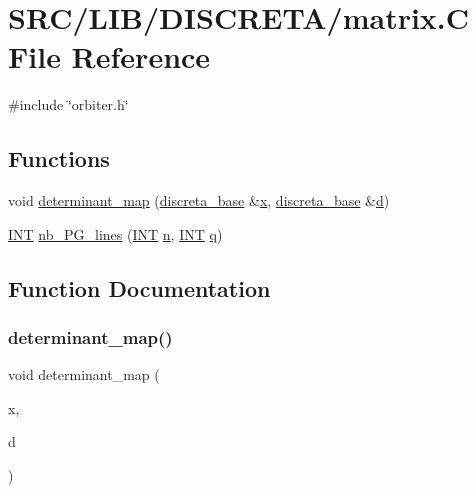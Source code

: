 \hypertarget{matrix_8_c}{}\section{S\+R\+C/\+L\+I\+B/\+D\+I\+S\+C\+R\+E\+T\+A/matrix.C File Reference}
\label{matrix_8_c}
{\ttfamily \#include \char`\"{}orbiter.\+h\char`\"{}}\newline
\subsection*{Functions}
\begin{DoxyCompactItemize}
\item 
void \mbox{\hyperlink{matrix_8_c_aa23aef50aaa071671d1e9207bcf3b7c8}{determinant\+\_\+map}} (\mbox{\hyperlink{classdiscreta__base}{discreta\+\_\+base}} \&\mbox{\hyperlink{alphabet2_8_c_a6150e0515f7202e2fb518f7206ed97dc}{x}}, \mbox{\hyperlink{classdiscreta__base}{discreta\+\_\+base}} \&\mbox{\hyperlink{simeon_8_c_a4339ca06fa882e69473d37bd6d7917d1}{d}})
\item 
\mbox{\hyperlink{galois_8h_a09fddde158a3a20bd2dcadb609de11dc}{I\+NT}} \mbox{\hyperlink{matrix_8_c_a59a0e6cd6007a72a4e54258b6820f1a9}{nb\+\_\+\+P\+G\+\_\+lines}} (\mbox{\hyperlink{galois_8h_a09fddde158a3a20bd2dcadb609de11dc}{I\+NT}} \mbox{\hyperlink{simeon_8_c_a7f2cd26777ce0ff3fdaf8d02aacbddfb}{n}}, \mbox{\hyperlink{galois_8h_a09fddde158a3a20bd2dcadb609de11dc}{I\+NT}} \mbox{\hyperlink{simeon_8_c_a92cbb483a3b27ae1a0dbfcb125ce216f}{q}})
\end{DoxyCompactItemize}


\subsection{Function Documentation}
\mbox{\label{matrix_8_c_aa23aef50aaa071671d1e9207bcf3b7c8}} 
\subsubsection{\texorpdfstring{determinant\+\_\+map()}{determinant\_map()}}
{\footnotesize\ttfamily void determinant\+\_\+map (\begin{DoxyParamCaption}\item[{\mbox{\hyperlink{classdiscreta__base}{discreta\+\_\+base}} \&}]{x,  }\item[{\mbox{\hyperlink{classdiscreta__base}{discreta\+\_\+base}} \&}]{d }\end{DoxyParamCaption})}

